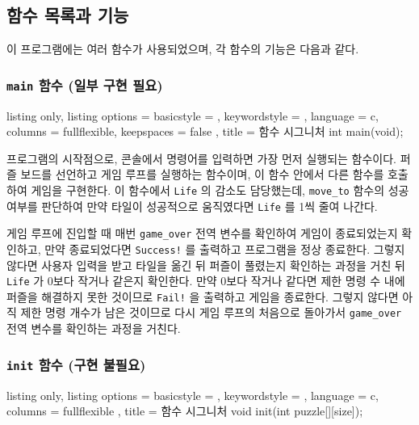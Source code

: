 \documentclass{article}
\newcommand{\code}[1]{
  \texttt{\large{#1}}
}
\begin{document}
\clearpage

\subsection{함수 목록과 기능}

이 프로그램에는 여러 함수가 사용되었으며, 각 함수의 기능은 다음과 같다.

\subsubsection{\code{main} 함수 (일부 구현 필요)}

\begin{tcblisting}{
    listing only,
    listing options = {
      basicstyle = \ttfamily,
      keywordstyle = \color{blue},
      language = c,
      columns = fullflexible,
      keepspaces = false
    },
    title = 함수 시그니처
  }int main(void);
\end{tcblisting}

프로그램의 시작점으로, 콘솔에서 명령어를 입력하면 가장 먼저 실행되는 함수이다. 퍼즐 보드를 선언하고 게임 루프를 실행하는 함수이며, 이 함수 안에서 다른 함수를 호출하여 게임을 구현한다. 이 함수에서 \code{Life}의 감소도 담당했는데, \code{move\_to} 함수의 성공 여부를 판단하여 만약 타일이 성공적으로 움직였다면 \code{Life}를 1씩 줄여 나간다.

게임 루프에 진입할 때 매번 \code{game\_over} 전역 변수를 확인하여 게임이 종료되었는지 확인하고, 만약 종료되었다면 \code{Success!}를 출력하고 프로그램을 정상 종료한다. 그렇지 않다면 사용자 입력을 받고 타일을 옮긴 뒤 퍼즐이 풀렸는지 확인하는 과정을 거친 뒤 \code{Life}가 0보다 작거나 같은지 확인한다. 만약 0보다 작거나 같다면 제한 명령 수 내에 퍼즐을 해결하지 못한 것이므로 \code{Fail!}을 출력하고 게임을 종료한다. 그렇지 않다면 아직 제한 명령 개수가 남은 것이므로 다시 게임 루프의 처음으로 돌아가서 \code{game\_over} 전역 변수를 확인하는 과정을 거친다.

\subsubsection{\code{init} 함수 (구현 불필요)}

\begin{tcblisting}{
    listing only,
    listing options = {
      basicstyle = \ttfamily,
      keywordstyle = \color{blue},
      language = c,
      columns = fullflexible
    },
    title = 함수 시그니처
  }void init(int puzzle[][size]);
\end{tcblisting}
\end{document}
